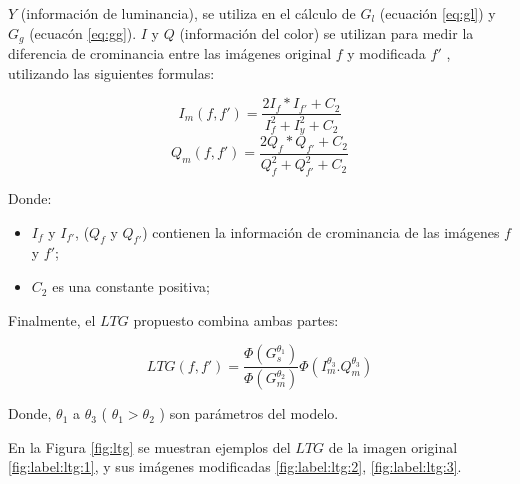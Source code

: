 $Y$ (información de luminancia), se utiliza en el cálculo de $G_l$ (ecuación \ref{eq:gl}) y $G_g$ (ecuacón \ref{eq:gg}). $I$ y $Q$ (información del color) se utilizan para medir la diferencia de crominancia entre las imágenes original $f$ y modificada $f'$ , utilizando las siguientes formulas:


\begin{equation}\label{eq:gm_3}
I_m(f,f') = \frac{2I_f*I_{f'}+C_2}{I_{f}^{2}+I_{y}^{2}+C_2} 
\end{equation}
\begin{equation}\label{eq:gm_4}
Q_m(f,f') = \frac{2Q_f*Q_{f'}+C_2}{Q_{f}^{2}+Q_{f'}^{2}+C_2} 
\end{equation}

Donde:
\begin{itemize}
\item $I_f$ y $I_{f'}$, ($Q_f$ y $Q_{f'}$) contienen la información de crominancia de las imágenes $f$ y $f'$;
\item $C_2$ es una constante positiva;
\end{itemize}

Finalmente, el $LTG$ propuesto combina ambas partes:

\begin{equation}\label{eq:ltg}
LTG(f, f') = \frac{\Phi(G_{s}^{\theta_1})}{\Phi(G_{m}^{\theta_2})} \Phi(I_{m}^{\theta_3}.Q_{m}^{\theta_3})
\end{equation}

Donde, $\theta_1$ a $\theta_3$ ( $\theta_1 > \theta_2$ ) son parámetros del modelo.

En la Figura \ref{fig:ltg} se muestran ejemplos del $LTG$ de la imagen original \ref{fig:label:ltg:1}, y sus imágenes modificadas \ref{fig:label:ltg:2}, \ref{fig:label:ltg:3}.

